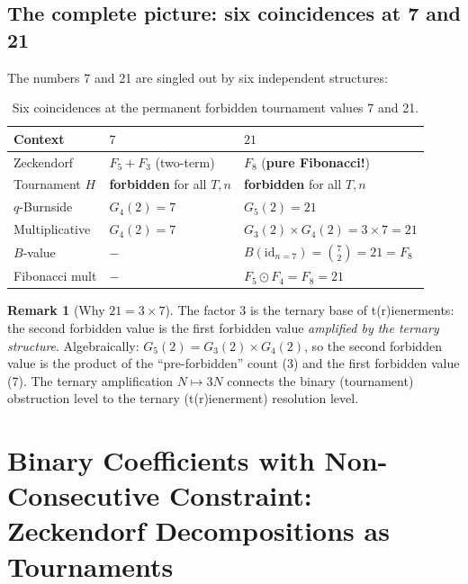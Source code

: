 \documentclass[12pt,reqno]{amsart}
\theoremstyle{definition}
\newtheorem{remark}[theorem]{Remark}
\theoremstyle{plain}
\begin{document}
\subsection{The complete picture: six coincidences at 7 and 21}

The numbers 7 and 21 are singled out by six independent structures:

\begin{table}[ht]
\centering
\caption{Six coincidences at the permanent forbidden tournament values 7 and 21.}
\small
\begin{tabular}{lll}
\toprule
Context & $7$ & $21$\\
\midrule
Zeckendorf & $F_5+F_3$ (two-term) & $F_8$ (\textbf{pure Fibonacci!})\\
Tournament $H$ & \textbf{forbidden} for all $T,n$ & \textbf{forbidden} for all $T,n$\\
$q$-Burnside & $G_4(2)=7$ & $G_5(2)=21$\\
Multiplicative & $G_4(2)=7$ & $G_3(2)\times G_4(2)=3\times7=21$\\
$B$-value & $-$ & $B(\mathrm{id}_{n=7})=\binom{7}{2}=21=F_8$\\
Fibonacci mult & $-$ & $F_5\odot F_4=F_8=21$\\
\bottomrule
\end{tabular}
\end{table}

\begin{remark}[Why $21=3\times 7$]
The factor 3 is the ternary base of t(r)ienerments: the second forbidden
value is the first forbidden value \emph{amplified by the ternary structure}.
Algebraically: $G_5(2)=G_3(2)\times G_4(2)$, so the second forbidden
value is the product of the ``pre-forbidden'' count (3) and the first
forbidden value (7).  The ternary amplification $N\mapsto 3N$ connects
the binary (tournament) obstruction level to the ternary (t(r)ienerment)
resolution level.
\end{remark}

\section{Binary Coefficients with Non-Consecutive Constraint:\\
Zeckendorf Decompositions as Tournaments}
\label{sec:binary-nonconsec}
\end{document}
